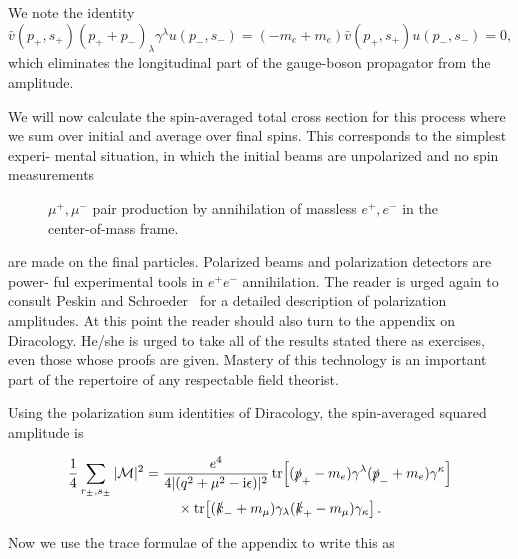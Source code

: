 We note the identity
\begin{equation*}
  \bar v(p_+,s_+)(p_++p_-)_{\lambda}\gamma^\lambda u(p_-,s_-)
  =(-m_e+m_e)\bar v(p_+,s_+)u(p_-,s_-)=0,
\end{equation*}
which eliminates the longitudinal part of the gauge-boson propagator from the
amplitude.

We will now calculate the spin-averaged total cross section for this process where we
sum over initial and average over final spins. This corresponds to the simplest experi-
mental situation, in which the initial beams are unpolarized and no spin measurements

\begin{figure}[htbp]
  \centering
  
  \caption{$\mu^+,\mu^-$ pair production by annihilation of massless $e^+,e^-$ in the center-of-mass frame.}
  \label{fig:6.3}
\end{figure}

are made on the final particles. Polarized beams and polarization detectors are power-
ful experimental tools in $e^+e^-$ annihilation. The reader is urged again to consult Peskin
and Schroeder~\cite{banks-ref-33} for a detailed description of polarization amplitudes. At this point
the reader should also turn to the appendix on Diracology. He/she is urged to take all
of the results stated there as exercises, even those whose proofs are given. Mastery of
this technology is an important part of the repertoire of any respectable field theorist.


Using the polarization sum identities of Diracology, the spin-averaged squared
amplitude is

\begin{equation}
  \begin{aligned}
  \frac14\sum_{r_\pm,s_\pm}|\mathcal{M}|^2
  ={}&\frac{e^4}{4\lvert(q^2+\mu^2-\mathrm{i}\epsilon)\rvert^2}
  \operatorname{tr}\!\left[(\slashed p_+-m_e)\gamma^\lambda
  (\slashed p_-+m_e)\gamma^\kappa\right]\\[-2pt]
  &\quad\times\operatorname{tr}\!\left[(\slashed k_-+m_\mu)\gamma_\lambda
  (\slashed k_+-m_\mu)\gamma_\kappa\right].
  \end{aligned}
  \label{eq:6.7}
\end{equation}

Now we use the trace formulae of the appendix to write this as

